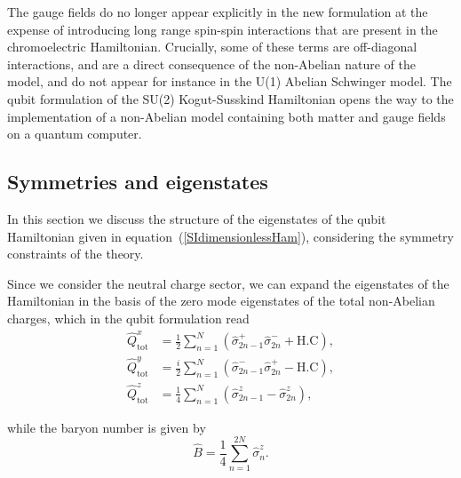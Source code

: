 \documentclass[twocolumn,aps,showpacs,prb,superscriptaddress,floatfix,10pt,nofootinbib]{revtex4-2}
\renewcommand{\eqref}[1]{equation~(\ref{#1})}
\begin{document}
The gauge fields do no longer appear explicitly in the new formulation at the expense of introducing long range spin-spin interactions that are present in the chromoelectric Hamiltonian. Crucially, some of these terms are off-diagonal interactions, and are a direct consequence of the non-Abelian nature of the model, and do not appear for instance in the U(1) Abelian Schwinger model. 
The qubit formulation of the SU(2) Kogut-Susskind Hamiltonian opens the way to the implementation of a non-Abelian model containing both matter and gauge fields on a quantum computer. 





\subsection{Symmetries and eigenstates}
\label{SI:singletstates}
In this section we discuss the structure of the eigenstates of the qubit Hamiltonian given in \eqref{SIdimensionlessHam}, considering the symmetry constraints of the theory. 

Since we consider the neutral charge sector, we can expand the eigenstates of the Hamiltonian in the basis of the zero mode eigenstates of the total non-Abelian charges, which in the qubit formulation read
\begin{align}
\hat{Q}_{\mathrm{tot}}^{x}&=\frac{1}{2}\sum_{n=1}^{N}\left( \hat{\sigma}_{2n-1}^{+}\hat{\sigma}_{2n}^{-}+\mathrm{H.C}\right), \label{Qtotx_qubitform}\\
\hat{Q}_{\mathrm{tot}}^{y}&=\frac{i}{2}\sum_{n=1}^{N}\left( \hat{\sigma}_{2n-1}^{-}\hat{\sigma}_{2n}^{+}-\mathrm{H.C}\right), \label{Qtoty_qubitform}\\
\hat{Q}_{\mathrm{tot}}^{z}&=\frac{1}{4}\sum_{n=1}^{N}\left( \hat{\sigma}_{2n-1}^{z}-\hat{\sigma}_{2n}^{z}\right),
\end{align}

while the baryon number is given by
\begin{equation}
\hat{B} = \frac{1}{4} \sum_{n=1}^{2N} \hat{\sigma}_n^z.
\end{equation}
\end{document}
